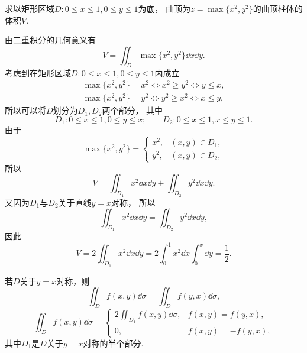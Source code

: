 \begin{example}
求以矩形区域\(D: 0 \leq x \leq 1,0 \leq y \leq 1\)为底，
曲顶为\(z = \max\{x^2,y^2\}\)的曲顶柱体的体积\(V\).
\begin{solution}
由二重积分的几何意义有\begin{equation*}
	V = \iint_D \max\{x^2,y^2\} \dd{x}\dd{y}.
\end{equation*}
考虑到在矩形区域\(D: 0 \leq x \leq 1,0 \leq y \leq 1\)内成立\begin{gather*}
	\max\{x^2,y^2\} = x^2
	\iff
	x^2 \geq y^2
	\iff
	y \leq x, \\
	\max\{x^2,y^2\} = y^2
	\iff
	y^2 \geq x^2
	\iff
	x \leq y,
\end{gather*}
所以可以将\(D\)划分为\(D_1,D_2\)两个部分，
其中\begin{equation*}
	D_1: 0 \leq x \leq 1,0 \leq y \leq x;
	\qquad
	D_2: 0 \leq x \leq 1,x \leq y \leq 1.
\end{equation*}
由于\begin{equation*}
	\max\{x^2,y^2\} = \begin{cases}
		x^2, & (x,y) \in D_1, \\
		y^2, & (x,y) \in D_2,
	\end{cases}
\end{equation*}
所以\begin{equation*}
	V
	= \iint_{D_1} x^2 \dd{x}\dd{y}
	+ \iint_{D_2} y^2 \dd{x}\dd{y}.
\end{equation*}
又因为\(D_1\)与\(D_2\)关于直线\(y=x\)对称，
所以\begin{equation*}
	\iint_{D_1} x^2 \dd{x}\dd{y}
	= \iint_{D_2} y^2 \dd{x}\dd{y},
\end{equation*}
因此\begin{equation*}
	V = 2 \iint_{D_1} x^2 \dd{x}\dd{y}
	= 2 \int_0^1 x^2 \dd{x} \int_0^x \dd{y}
	= \frac12.
\end{equation*}
\end{solution}
\end{example}

若\(D\)关于\(y=x\)对称，则\[
	\iint_D f(x,y) \dd\sigma = \iint_D f(y,x) \dd\sigma,
\]\[
	\iint_D f(x,y) \dd\sigma
	= \left\{ \begin{array}{cc}
		2 \iint_{D_1} f(x,y) \dd\sigma, & f(x,y) = f(y,x), \\
		0, & f(x,y) = -f(y,x),
	\end{array} \right.
\]
其中\(D_1\)是\(D\)关于\(y=x\)对称的半个部分.


